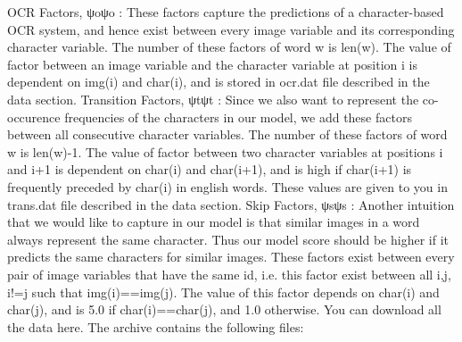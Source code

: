 OCR Factors, ψoψo : These factors capture the predictions of a character-based OCR system, and hence exist between every image variable and its corresponding character variable. The number of these factors of word w is len(w). The value of factor between an image variable and the character variable at position i is dependent on img(i) and char(i), and is stored in ocr.dat file described in the data section.
Transition Factors, ψtψt : Since we also want to represent the co-occurence frequencies of the characters in our model, we add these factors between all consecutive character variables. The number of these factors of word w is len(w)-1. The value of factor between two character variables at positions i and i+1 is dependent on char(i) and char(i+1), and is high if char(i+1) is frequently preceded by char(i) in english words. These values are given to you in trans.dat file described in the data section.
Skip Factors, ψsψs : Another intuition that we would like to capture in our model is that similar images in a word always represent the same character. Thus our model score should be higher if it predicts the same characters for similar images. These factors exist between every pair of image variables that have the same id, i.e. this factor exist between all i,j, i!=j such that img(i)==img(j). The value of this factor depends on char(i) and char(j), and is 5.0 if char(i)==char(j), and 1.0 otherwise.
You can download all the data here. The archive contains the following files:

